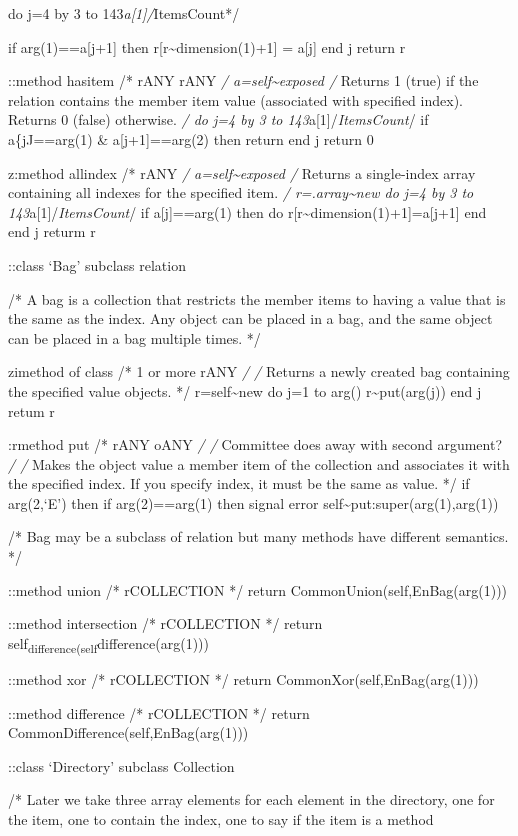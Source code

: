 do j=4 by 3 to 143\emph{a{[}1{]}/}ItemsCount*/

if arg(1)==a{[}j+1{]} then r{[}r\textasciitilde dimension(1)+1{]} =
a{[}j{]} end j return r

::method hasitem /* rANY rANY \emph{/ a=self\textasciitilde exposed /}
Returns 1 (true) if the relation contains the member item value
(associated with specified index). Returns 0 (false) otherwise. \emph{/
do j=4 by 3 to 143}a{[}1{]}/\emph{ItemsCount}/ if a\{jJ==arg(1) \&
a{[}j+1{]}==arg(2) then return \textbar{} end j return 0

z:method allindex /* rANY \emph{/ a=self\textasciitilde exposed /}
Returns a single-index array containing all indexes for the specified
item. \emph{/ r=.array\textasciitilde new do j=4 by 3 to
143}a{[}1{]}/\emph{ItemsCount}/ if a{[}j{]}==arg(1) then do
r{[}r\textasciitilde dimension(1)+1{]}=a{[}j+1{]} end end j returm r

::class `Bag' subclass relation

/* A bag is a collection that restricts the member items to having a
value that is the same as the index. Any object can be placed in a bag,
and the same object can be placed in a bag multiple times. */

zimethod of class /* 1 or more rANY \emph{/ /} Returns a newly created
bag containing the specified value objects. */ r=self\textasciitilde new
do j=1 to arg() r\textasciitilde put(arg(j)) end j retum r

:rmethod put /* rANY oANY \emph{/ /} Committee does away with second
argument? \emph{/ /} Makes the object value a member item of the
collection and associates it with the specified index. If you specify
index, it must be the same as value. */ if arg(2,`E') then if
arg(2)==arg(1) then signal error
self\textasciitilde put:super(arg(1),arg(1))

/* Bag may be a subclass of relation but many methods have different
semantics. */

::method union /* rCOLLECTION */ return CommonUnion(self,EnBag(arg(1)))

::method intersection /* rCOLLECTION */ return
self\textsubscript{difference(self}difference(arg(1)))

::method xor /* rCOLLECTION */ return CommonXor(self,EnBag(arg(1)))

::method difference /* rCOLLECTION */ return
CommonDifference(self,EnBag(arg(1)))

::class `Directory' subclass Collection

/* Later we take three array elements for each element in the directory,
one for the item, one to contain the index, one to say if the item is a
method

